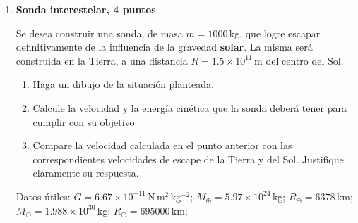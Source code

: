 \documentclass[a4paper,12pt]{article}
\begin{document}
\begin{enumerate}
\item {\bf{Sonda interestelar, 4 puntos}}

Se desea construir una sonda, de masa $m=1000$\,kg, que logre escapar
definitivamente de la influencia de la gravedad {\bf{solar}}. La misma
será construida en la Tierra, a una distancia $R=1.5\times10^{11}$\,m
del centro del Sol. 

\begin{enumerate}
\item Haga un dibujo de la situación planteada. 
\item Calcule la velocidad y la energía cinética que la sonda deberá
tener para cumplir con su objetivo.
\item Compare la velocidad calculada en el punto anterior con las
correspondientes velocidades de escape de la Tierra y del Sol.
Justifique claramente su respuesta.
\end{enumerate}
Datos útiles: $G = 6.67 \times 10^{-11}$\,N\,m$^2$\,kg$^{-2}$;
$M_\oplus = 5.97\times10^{24}$\,kg; $R_\oplus=6378$\,km;
$M_\odot = 1.988\times10^{30}$\,kg; $R_\odot=695000$\,km;


\end{enumerate}
\end{document}

